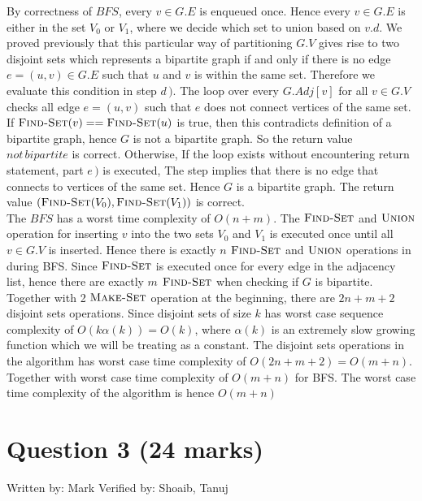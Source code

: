 \documentclass[11pt]{article}
\begin{document}
\begin{enumerate}[label=\alph*)]
\begin{solution}
  By correctness of $BFS$, every $v\in G.E$ is enqueued once. Hence every $v\in G.E$ is either in the set $V_0$ or $V_1$, where we decide which set to union based on $v.d$. We proved previously that this particular way of partitioning $G.V$ gives rise to two disjoint sets which represents a bipartite graph if and only if there is no edge $e = (u, v) \in G.E$ such that $u$ and $v$ is within the same set. Therefore we evaluate this condition in step $d \, )$. The loop over every $G.Adj[v]$ for all $v\in G.V$ checks all edge $e = (u, v)$ such that $e$ does not connect vertices of the same set. If $\textsc{Find-Set}(v) == \textsc{Find-Set}(u)$ is true, then this contradicts definition of a bipartite graph, hence $G$ is not a bipartite graph. So the return value $not\,bipartite$ is correct. Otherwise, If the loop exists without encountering return statement, part $e\,)$ is executed, The step implies that there is no edge that connects to vertices of the same set. Hence $G$ is a bipartite graph. The return value $(\textsc{Find-Set}(V_0), \textsc{Find-Set}(V_1))$ is correct.\\
  The $BFS$ has a worst time complexity of $O(n+m)$. The $\textsc{Find-Set}$ and $\textsc{Union}$ operation for inserting $v$ into the two sets $V_0$ and $V_1$ is executed once until all $v\in G.V$ is inserted. Hence there is exactly $n$ $\textsc{Find-Set}$ and $\textsc{Union}$ operations in during BFS. Since $\textsc{Find-Set}$ is executed once for every edge in the adjacency list, hence there are exactly $m$ $\textsc{Find-Set}$ when checking if $G$ is bipartite. Together with 2 $\textsc{Make-Set}$ operation at the beginning, there are $2n+m+2$ disjoint sets operations. Since disjoint sets of size $k$ has worst case sequence complexity of $O(k\alpha(k)) = O(k)$, where $\alpha(k)$ is an extremely slow growing function which we will be treating as a constant. The disjoint sets operations in the algorithm has worst case time complexity of $O(2n+m+2) = O(m+n)$. Together with worst case time complexity of $O(m+n)$ for BFS. The worst case time complexity of the algorithm is hence $O(m+n)$
\end{solution}

\end{enumerate}

\section*{Question 3 (24 marks)}
Written by: Mark\newline
Verified by: Shoaib, Tanuj\newline
\end{document}
